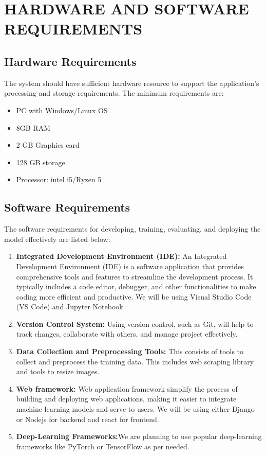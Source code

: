 \newpage
\section{HARDWARE AND SOFTWARE REQUIREMENTS}
\subsection{Hardware Requirements}
The system should have sufficient hardware resource to support the application’s
processing and storage requirements. The minimum requirements are:
\begin{itemize}
    \item PC with Windows/Linux OS
    \item 8GB RAM 
    \item 2 GB Graphics card 
    \item 128 GB storage
    \item Processor: intel i5/Ryzen 5
\end{itemize}
\subsection{Software Requirements}
The software requirements for developing, training, evaluating, and deploying the
model effectively are listed below: 
\begin{enumerate}
    \item {\bf Integrated Development Environment (IDE):} An Integrated Development
    Environment (IDE) is a software application that provides comprehensive tools
    and features to streamline the development process. It typically includes a code
    editor, debugger, and other functionalities to make coding more efficient and
    productive. We will be using Visual Studio Code (VS Code) and Jupyter
    Notebook
    \item {\bf Version Control System:} Using version control, such as Git, will help to track
    changes, collaborate with others, and manage project effectively.
    \item {\bf Data Collection and Preprocessing Tools:} This consists of tools to collect and
    preprocess the training data. This includes web scraping library and tools to
    resize images.
    \item {\bf Web framework:} Web application framework simplify the process of building
    and deploying web applications, making it easier to integrate machine learning
    models and serve to users. We will be using either Django or Nodejs for
    backend and react for frontend.
    \item {\bf Deep-Learning Frameworks:}We are planning to use popular deep-learning
    frameworks like PyTorch or TensorFlow as per needed.
\end{enumerate}